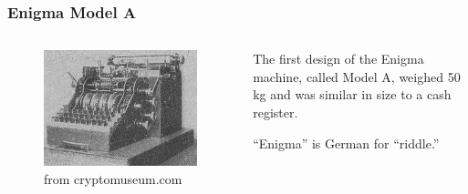 \documentclass{beamer}
\newcommand{\<}{\langle}
\renewcommand{\>}{\rangle}
\begin{document}
\begin{frame}
\frametitle{Enigma Model A}
\begin{columns}
\begin{column}{.5\textwidth}
\begin{figure}
\includegraphics[scale=.3]{IMG/modelA.jpg}
\caption{\scriptsize from cryptomuseum.com}
\end{figure}
\end{column}

\begin{column}{.5\textwidth}
The first design of the Enigma machine, called Model A, weighed 50 kg and was similar in size to a cash register. \newline

``Enigma'' is German for ``riddle.''
\end{column}
\end{columns}
\end{frame}
\end{document}
